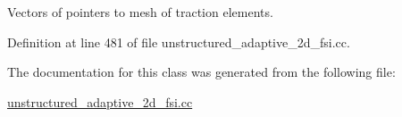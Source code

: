 Vectors of pointers to mesh of traction elements. 



Definition at line 481 of file unstructured\+\_\+adaptive\+\_\+2d\+\_\+fsi.\+cc.



The documentation for this class was generated from the following file\+:\begin{DoxyCompactItemize}
\item 
\hyperlink{unstructured__adaptive__2d__fsi_8cc}{unstructured\+\_\+adaptive\+\_\+2d\+\_\+fsi.\+cc}\end{DoxyCompactItemize}
